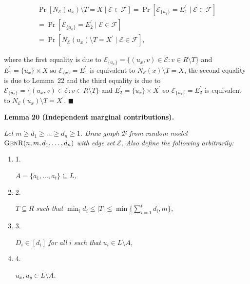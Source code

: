 \[\begin{gathered}
\displaystyle\Pr[N_{\mathcal{E}}(u_{x})\setminus T=X\mid\mathcal{E}\in\mathscr{F}] \displaystyle=\Pr[\mathcal{E}_{\{u_{x}\}}=E^{\prime}_{1}\mid\mathcal{E}\in\mathscr{F}] \\
\displaystyle=\Pr[\mathcal{E}_{\{u_{x}\}}=E^{\prime}_{2}\mid\mathcal{E}\in\mathscr{F}] \\
\displaystyle=\Pr[N_{\mathcal{E}}(u_{x})\setminus T=X^{\prime}\mid\mathcal{E}\in\mathscr{F}],
\end{gathered}\]


where the first equality is due to $\mathcal{E}_{\{u_{x}\}}=\{(u_{x},v)\in\mathcal{E}:v\in R\setminus T\}$ and $E^{\prime}_{1}=\{u_{x}\}\times X$ so $\mathcal{E}_{\{x\}}=E^{\prime}_{1}$ is equivalent to $N_{\mathcal{E}}(x)\setminus T=X$, the second equality is due to Lemma 22 and the third equality is due to $\mathcal{E}_{\{u_{x}\}}=\{(u_{x},v)\in\mathcal{E}:v\in R\setminus T\}$ and $E^{\prime}_{2}=\{u_{x}\}\times X^{\prime}$ so $\mathcal{E}_{\{u_{x}\}}=E^{\prime}_{2}$ is equivalent to $N_{\mathcal{E}}(u_{x})\setminus T=X^{\prime}$.
\ensuremath{\blacksquare}\par






\par\medskip\noindent\textbf{\textbf{Lemma 20}\textbf{ }(Independent marginal contributions)\textbf{.}}\par



\emph{Let $m\geq d_{1}\geq\dots\geq d_{n}\geq 1$. Draw graph $\mathcal{B}$ from random model $\textsc{GenR}(n,m,d_{1},\dots,d_{n})$ with edge set $\mathcal{E}$.
Also define the following arbitrarily:}\par


\begin{enumerate}


\item[] 1. 


$A=\{a_{1},\dots,a_{t}\}\subseteq L$\emph{,}\par




\item[] 2. 


$T\subseteq R$\emph{ such that }$\min_{i}{d_{i}}\leq|T|\leq\min\{\sum_{i=1}^{t}d_{i},m\}$\emph{,}\par




\item[] 3. 


$D_{i}\in[d_{i}]$\emph{ for all }$i$\emph{ such that }$u_{i}\in L\setminus A$\emph{,}\par




\item[] 4. 


$u_{x},u_{y}\in L\setminus A$\emph{.}\par




\end{enumerate}


